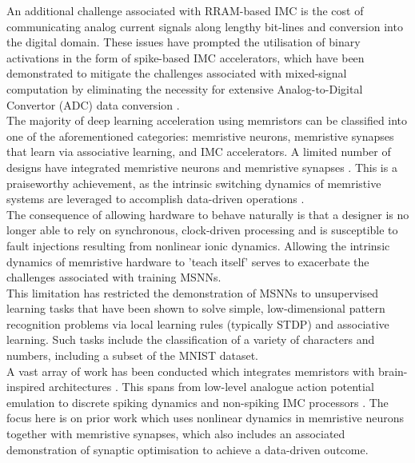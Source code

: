 \noindent An additional challenge associated with RRAM-based IMC is the cost of communicating analog current signals along lengthy bit-lines and conversion into the digital domain. These issues have prompted the utilisation of binary activations in the form of spike-based IMC accelerators, which have been demonstrated to mitigate the challenges associated with mixed-signal computation by eliminating the necessity for extensive Analog-to-Digital Convertor (ADC) data conversion \cite{eshraghian2022memristor}. \\

\noindent The majority of deep learning acceleration using memristors can be classified into one of the aforementioned categories: memristive neurons, memristive synapses that learn via associative learning, and IMC accelerators. A limited number of designs have integrated memristive neurons and memristive synapses \cite{wang2018fully}. This is a praiseworthy achievement, as the intrinsic switching dynamics of memristive systems are leveraged to accomplish data-driven operations \cite{tang2020fully}. \\

\noindent The consequence of allowing hardware to behave naturally is that a designer is no longer able to rely on synchronous, clock-driven processing and is susceptible to fault injections resulting from nonlinear ionic dynamics. Allowing the intrinsic dynamics of memristive hardware to 'teach itself' serves to exacerbate the challenges associated with training MSNNs. \\

\noindent This limitation has restricted the demonstration of MSNNs to unsupervised learning tasks that have been shown to solve simple, low-dimensional pattern recognition problems via local learning rules (typically STDP) and associative learning. Such tasks include the classification of a variety of characters and numbers, including a subset of the MNIST dataset. \\

\noindent A vast array of work has been conducted which integrates memristors with brain-inspired architectures \cite{kang2021build}. This spans from low-level analogue action potential emulation to discrete spiking dynamics and non-spiking IMC processors \cite{eshraghian2022memristor}. The focus here is on prior work which uses nonlinear dynamics in memristive neurons together with memristive synapses, which also includes an associated demonstration of synaptic optimisation to achieve a data-driven outcome. \\

